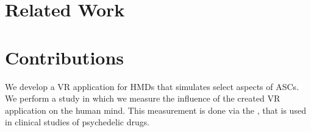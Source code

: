 \section{Related Work}

\section{Contributions}
We develop a \ac{VR} application for \acp{HMD} that simulates select aspects of \acp{ASC}.
We perform a study in which we measure the influence of the created \ac{VR} application on the human mind. This measurement is done via the , that is used in clinical studies of psychedelic drugs.
